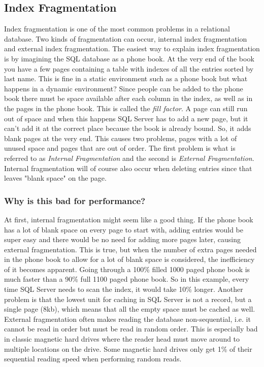 \documentclass{cslthse-msc}
\begin{document}
\subsection{Index Fragmentation}
Index fragmentation is one of the most common problems in a relational database. Two kinds of fragmentation can occur, internal index fragmentation and external index fragmentation. The easiest way to explain index fragmentation is by imagining the SQL database as a phone book. At the very end of the book you have a few pages containing a table with indexes of all the entries sorted by last name. This is fine in a static environment such as a phone book but what happens in a dynamic environment?
Since people can be added to the phone book there must be space available after each column in the index, as well as in the pages in the phone book. This is called the \emph{fill factor}. A page can still run out of space and when this happens SQL Server has to add a new page, but it can't add it at the correct place because the book is already bound. So, it adds blank pages at the very end. This causes two problems, pages with a lot of unused space and pages that are out of order. The first problem is what is referred to as \emph{Internal Fragmentation} and the second is \emph{External Fragmentation}. Internal fragmentation will of course also occur when deleting entries since that leaves "blank space" on the page.   \cite{Ozar12}

\subsubsection{Why is this bad for performance?}\label{sec:indexbad}
At first, internal fragmentation might seem like a good thing. If the phone book has a lot of blank space on every page to start with, adding entries would be super easy and there would be no need for adding more pages later, causing external fragmentation. This is true, but when the number of extra pages needed in the phone book to allow for a lot of blank space is considered, the inefficiency of it becomes apparent. Going through a 100\% filled 1000 paged phone book is much faster than a 90\% full 1100 paged phone book. So in this example, every time SQL Server needs to scan the index, it would take 10\% longer. Another problem is that the lowest unit for caching in SQL Server is not a record, but a single page (8kb), which means that all the empty space must be cached as well. \\

External fragmentation often makes reading the database non-sequential, i.e. it cannot be read in order but must be read in random order. This is especially bad in classic magnetic hard drives where the reader head must move around to multiple locations on the drive. Some magnetic hard drives only get 1\% of their sequential reading speed when performing random reads.   \cite{Toshiba12}
\end{document}
